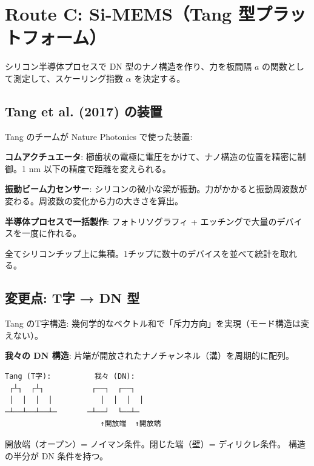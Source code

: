 \documentclass[12pt,a4paper]{article}
\begin{document}
\section{Route C: Si-MEMS（Tang 型プラットフォーム）}

\begin{storybox}[何をするか（一言）]
シリコン半導体プロセスで DN 型のナノ構造を作り、力を板間隔 $a$ の関数として測定して、スケーリング指数 $\alpha$ を決定する。
\end{storybox}

\subsection{Tang et al. (2017) の装置}
\begin{storybox}[既存プラットフォーム]
Tang のチームが Nature Photonics で使った装置:

\textbf{コムアクチュエータ}: 櫛歯状の電極に電圧をかけて、ナノ構造の位置を精密に制御。1 nm 以下の精度で距離を変えられる。

\textbf{振動ビーム力センサー}: シリコンの微小な梁が振動。力がかかると振動周波数が変わる。周波数の変化から力の大きさを算出。

\textbf{半導体プロセスで一括製作}: フォトリソグラフィ + エッチングで大量のデバイスを一度に作れる。

全てシリコンチップ上に集積。1チップに数十のデバイスを並べて統計を取れる。
\end{storybox}

\subsection{変更点: T字 → DN 型}
\begin{expbox}
Tang のT字構造: 幾何学的なベクトル和で「斥力方向」を実現（モード構造は変えない）。

\textbf{我々の DN 構造}: 片端が開放されたナノチャンネル（溝）を周期的に配列。

\begin{verbatim}
Tang (T字):          我々 (DN):
 ┌┴┐  ┌┴┐           ┌──┐  ┌──┐
 │  │  │  │           │  │  │  │
─┴──┴──┴──┴─       ─┴──┘  └──┴─
                      ↑開放端  ↑開放端
\end{verbatim}

開放端（オープン）= ノイマン条件。閉じた端（壁）= ディリクレ条件。
構造の半分が DN 条件を持つ。
\end{expbox}
\end{document}
